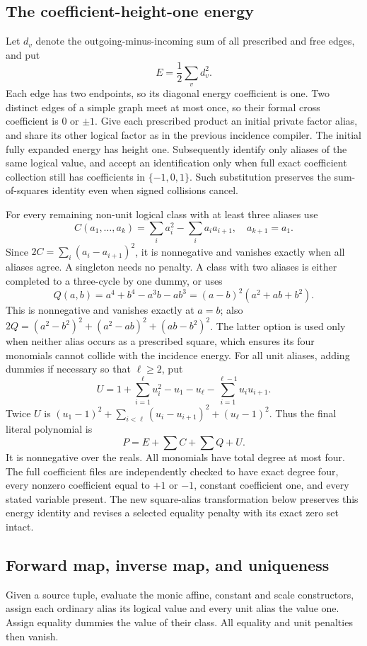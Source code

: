 \subsection{The coefficient-height-one energy}
Let $d_v$ denote the outgoing-minus-incoming sum of all prescribed and
free edges, and put
\[
 E=\frac12\sum_vd_v^2.
\]
Each edge has two endpoints, so its diagonal energy coefficient is one.
Two distinct edges of a simple graph meet at most once, so their formal
cross coefficient is $0$ or $\pm1$. Give each prescribed product an
initial private factor alias, and share its other logical factor as in the
previous incidence compiler. The initial fully expanded energy has height
one. Subsequently identify only aliases of the same logical value, and
accept an identification only when full exact coefficient collection
still has coefficients in $\{-1,0,1\}$. Such substitution preserves the
sum-of-squares identity even when signed collisions cancel.

For every remaining non-unit logical class with at least three aliases use
\[
 C(a_1,\ldots,a_k)=\sum_i a_i^2-\sum_i a_i a_{i+1},\quad a_{k+1}=a_1.
\]
Since $2C=\sum_i(a_i-a_{i+1})^2$, it is nonnegative and vanishes exactly
when all aliases agree. A singleton needs no penalty. A class with two
aliases is either completed to a three-cycle by one dummy, or uses
\[
 Q(a,b)=a^4+b^4-a^3b-ab^3=(a-b)^2(a^2+ab+b^2).
\]
This is nonnegative and vanishes exactly at $a=b$; also
$2Q=(a^2-b^2)^2+(a^2-ab)^2+(ab-b^2)^2$. The latter option is used only
when neither alias occurs as a prescribed square, which ensures its four
monomials cannot collide with the incidence energy. For all unit aliases,
adding dummies if necessary so that $\ell\ge2$, put
\[
 U=1+\sum_{i=1}^{\ell}u_i^2-u_1-u_\ell-
       \sum_{i=1}^{\ell-1}u_iu_{i+1}.
\]
Twice $U$ is $(u_1-1)^2+\sum_{i<\ell}(u_i-u_{i+1})^2+(u_\ell-1)^2$.
Thus the final literal polynomial is
\begin{equation}\label{eq:networkenergy}
 \boxed{P=E+\sum C+\sum Q+U.}
\end{equation}
It is nonnegative over the reals. All monomials have total degree at most
four. The full coefficient files are independently checked to have exact
degree four, every nonzero coefficient equal to $+1$ or $-1$, constant
coefficient one, and every stated variable present. The new square-alias transformation below preserves this energy identity
and revises a selected equality penalty with its exact zero set intact.

\subsection{Forward map, inverse map, and uniqueness}
Given a source tuple, evaluate the monic affine, constant and scale
constructors, assign each ordinary alias its logical value and every unit
alias the value one. Assign equality dummies the value of their class.
All equality and unit penalties then vanish.

